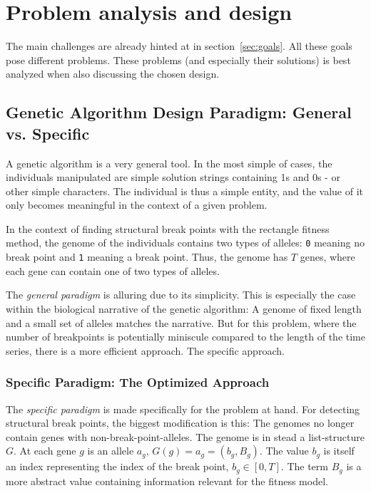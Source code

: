 
\section{Problem analysis and design} \label{sec:analysis-design} 

The main challenges are already hinted at in section~\ref{sec:goals}. All these
goals pose different problems. These problems (and especially their solutions)
is best analyzed when also discussing the chosen design.


\subsection{Genetic Algorithm Design Paradigm: General vs. Specific}
\label{sec:GA-design-paradigm}

A genetic algorithm is a very general tool. In the most simple of cases, the
individuals manipulated are simple solution strings containing 1s and 0s - or
other simple characters. The individual is thus a simple entity, and the value
of it only becomes meaningful in the context of a given problem.

In the context of finding structural break points with the rectangle fitness
method, the genome of the individuals contains two types of alleles: \texttt{0}
meaning no break point and \texttt{1} meaning a break point. Thus, the genome
has $T$ genes, where each gene can contain one of two types of alleles. 

The \textit{general paradigm} is alluring due to its simplicity. This is
especially the case within the biological narrative of the genetic algorithm: A
genome of fixed length and a small set of alleles matches the narrative. But for
this problem, where the number of breakpoints is potentially miniscule compared
to the length of the time series, there is a more efficient approach. The
specific approach.  


\subsubsection{Specific Paradigm: The Optimized Approach}
\label{sec:specific-approach}

The \textit{specific paradigm} is made specifically for the problem at hand. For
detecting structural break points, the biggest modification is this: The genomes
no longer contain genes with non-break-point-alleles. The genome is in stead a
list-structure $G$. At each gene $g$ is an allele $a_g$, $G(g) = a_g = (b_g,
B_g)$. The value $b_g$ is itself an index representing the index of the break
point, $b_g \in [0, T]$. The term $B_g$ is a more abstract value containing
information relevant for the fitness model. 


